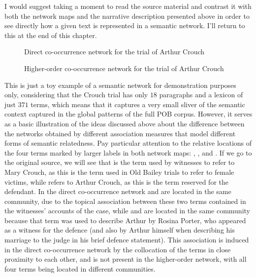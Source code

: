 I would suggest taking a moment to read the source material and contrast it with both the network maps and the narrative description presented above in order to see directly how a given text is represented in a semantic network.
I'll return to this at the end of this chapter.

\begin{figure}
    \centerfloat
    
    \caption{Direct co-occurrence network for the trial of Arthur Crouch}
    \label{fig:crouch_ppmi}
\end{figure}

\begin{figure}
    \centerfloat
    
    \caption{Higher-order co-occurrence network for the trial of Arthur Crouch}
    \label{fig:crouch_difw}
\end{figure}

This is just a toy example of a semantic network for demonstration purposes only, considering that the Crouch trial has only $18$ paragraphs and a lexicon of just $371$ terms, which means that it captures a very small sliver of the semantic context captured in the global patterns of the full POB corpus.
However, it serves as a basic illustration of the ideas discussed above about the difference between the networks obtained by different association measures that model different forms of semantic relatedness.
Pay particular attention to the relative locations of the four terms marked by larger labels in both network maps: , ,  and .
If we go to the original source, we will see that  is the term used by witnesses to refer to Mary Crouch, as this is the term used in Old Bailey trials to refer to female victims, while  refers to Arthur Crouch, as this is the term reserved for the defendant.
In the direct co-occurrence network  and  are located in the same community, due to the topical association between these two terms contained in the witnesses' accounts of the case, while  and  are located in the same community because that term was used to describe Arthur by Rosina Porter, who appeared as a witness for the defence (and also by Arthur himself when describing his marriage to the judge in his brief defence statement).
This association is induced in the direct co-occurrence network by the collocation of the terms in close proximity to each other, and is not present in the higher-order network, with all four terms being located in different communities.

